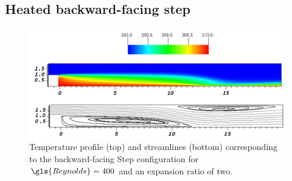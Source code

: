 
\subsection{Heated backward-facing step}\label{ssec:HeatedBackwardFacingStep}
\begin{figure}[tb]
	\begin{center}
		\includegraphics[width=\linewidth]{../plots/HBFS_TemperatureRe700_2.pdf}
		\caption{Temperature profile (top) and streamlines (bottom) corresponding to the backward-facing Step configuration for $\gls{Reynolds} = 400$ and an expansion ratio of two.}
		\label{BFS_Streamlines}
	\end{center}
\end{figure}

